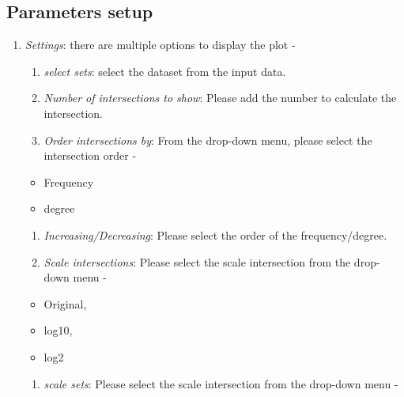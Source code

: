 \documentclass[
  a4paper,
  oneside,
  open=any]{scrreport}
\providecommand{\tightlist}{%
  \setlength{\itemsep}{0pt}\setlength{\parskip}{0pt}}\usepackage{longtable,booktabs,array}
\begin{document}
\hypertarget{parameters-setup-4}{%
\subsection{Parameters setup}\label{parameters-setup-4}}

\begin{enumerate}
\def\labelenumi{\arabic{enumi}.}
\setcounter{enumi}{1}
\item
  \emph{Settings}: there are multiple options to display the plot -

  \begin{enumerate}
  \def\labelenumii{\roman{enumii}.}
  \item
    \emph{select sets}: select the dataset from the input data.
  \item
    \emph{Number of intersections to show}: Please add the number to
    calculate the intersection.
  \item
    \emph{Order intersections by}: From the drop-down menu, please
    select the intersection order -
  \end{enumerate}

  \begin{itemize}
  \tightlist
  \item
    Frequency
  \item
    degree
  \end{itemize}

  \begin{enumerate}
  \def\labelenumii{\roman{enumii}.}
  \setcounter{enumii}{3}
  \item
    \emph{Increasing/Decreasing}: Please select the order of the
    frequency/degree.
  \item
    \emph{Scale intersections}: Please select the scale intersection
    from the drop-down menu -
  \end{enumerate}

  \begin{itemize}
  \tightlist
  \item
    Original,
  \item
    log10,
  \item
    log2
  \end{itemize}

  \begin{enumerate}
  \def\labelenumii{\roman{enumii}.}
  \setcounter{enumii}{5}
  \tightlist
  \item
    \emph{scale sets}: Please select the scale intersection from the
    drop-down menu -
  \end{enumerate}


\end{enumerate}
\end{document}
